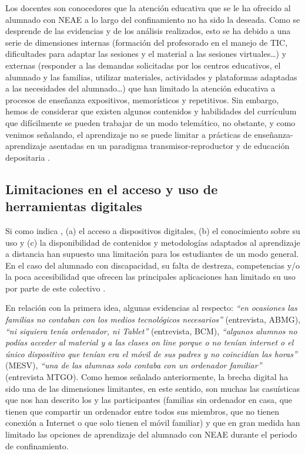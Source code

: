 \documentclass[spanish]{textolivre}
\begin{document}
Los docentes son conocedores que la atención educativa que se le ha ofrecido al alumnado con NEAE a lo largo del confinamiento no ha sido la deseada. Como se desprende de las evidencias y de los análisis realizados, esto se ha debido a una serie de dimensiones internas (formación del profesorado en el manejo de TIC, dificultades para adaptar las sesiones y el material a las sesiones virtuales…) y externas (responder a las demandas solicitadas por los centros educativos, el alumnado y las familias, utilizar materiales, actividades y plataformas adaptadas a las necesidades del alumnado…) que han limitado la atención educativa a procesos de enseñanza expositivos, memorísticos y repetitivos. Sin embargo, hemos de considerar que existen algunos contenidos y habilidades del currículum que difícilmente se pueden trabajar de un modo telemático, no obstante, y como venimos señalando, el aprendizaje no se puede limitar a prácticas de enseñanza-aprendizaje asentadas en un paradigma transmisor-reproductor y de educación depositaria \cite{freire1970}. %

\subsection{Limitaciones en el acceso y uso de herramientas digitales}
Si como indica \textcite[p. 176]{rogero2020}, %
(a) el acceso a dispositivos digitales, (b) el conocimiento sobre su uso y (c) la disponibilidad de contenidos y metodologías adaptados al aprendizaje a distancia han supuesto una limitación para los estudiantes de un modo general. En el caso del alumnado con discapacidad, su falta de destreza, competencias y/o la poca accesibilidad que ofrecen las principales aplicaciones han limitado su uso por parte de este colectivo \cite{murillo2020}. %

En relación con la primera idea, algunas evidencias al respecto: \emph{“en ocasiones las familias no contaban con los medios tecnológicos necesarios”} (entrevista, ABMG), \emph{“ni siquiera tenía ordenador, ni Tablet”} (entrevista, BCM), \emph{“algunos alumnos no podías acceder al material y a las clases on line porque o no tenían internet o el único dispositivo que tenían era el móvil de sus padres y no coincidían las horas”} (MESV), \emph{“una de las alumnas solo contaba con un ordenador familiar”} (entrevista MTGO). Como hemos señalado anteriormente, la brecha digital ha sido una de las dimensiones limitantes, en este sentido, son muchas las casuísticas que nos han descrito los y las participantes (familias sin ordenador en casa, que tienen que compartir un ordenador entre todos sus miembros, que no tienen conexión a Internet o que solo tienen el móvil familiar) y que en gran medida han limitado las opciones de aprendizaje del alumnado con NEAE durante el periodo de confinamiento.  
\end{document}
